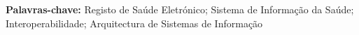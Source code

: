 \section*{}
\textbf{Palavras-chave:} Registo de Saúde Eletrónico; Sistema de Informação da Saúde; Interoperabilidade; Arquitectura de Sistemas de Informação

%
